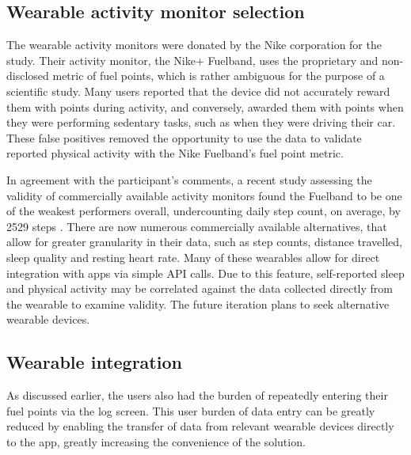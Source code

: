 \subsection{Wearable activity monitor selection}
The wearable activity monitors were donated by the Nike corporation for the study. Their activity monitor, the Nike+ Fuelband, uses the proprietary and non-disclosed metric of fuel points, which is rather ambiguous for the purpose of a scientific study. Many users reported that the device did not accurately reward them with points during activity, and conversely, awarded them with points when they were performing sedentary tasks, such as when they were driving their car. These false positives removed the opportunity to use the data to validate reported physical activity with the Nike Fuelband’s fuel point metric.

In agreement with the participant’s comments, a recent study assessing the validity of commercially available activity monitors found the Fuelband to be one of the weakest performers overall, undercounting daily step count, on average, by 2529 steps \cite{Ferguson2015}. There are now numerous commercially available alternatives, that allow for greater granularity in their data, such as step counts, distance travelled, sleep quality and resting heart rate. Many of these wearables allow for direct integration with apps via simple API calls. Due to this feature, self-reported sleep and physical activity may be correlated against the data collected directly from the wearable to examine validity. The future iteration plans to seek alternative wearable devices.

\subsection{Wearable integration}
As discussed earlier, the users also had the burden of repeatedly entering their fuel points via the log screen. This user burden of data entry can be greatly reduced by enabling the transfer of data from relevant wearable devices directly to the app, greatly increasing the convenience of the solution.

